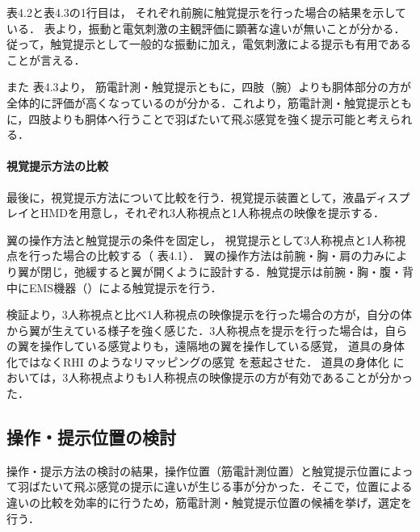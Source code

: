 \begin{small}
      表4.2と表4.3の1行目は，
      それぞれ前腕に触覚提示を行った場合の結果を示している．
      表より，振動と電気刺激の主観評価に顕著な違いが無いことが分かる．従って，触覚提示として一般的な振動に加え，電気刺激による提示も有用であることが言える．

      また
      表4.3より，
      筋電計測・触覚提示ともに，四肢（腕）よりも胴体部分の方が全体的に評価が高くなっているのが分かる．これより，筋電計測・触覚提示ともに，四肢よりも胴体へ行うことで羽ばたいて飛ぶ感覚を強く提示可能と考えられる．
      

    \paragraph{視覚提示方法の比較} %
      最後に，視覚提示方法について比較を行う．視覚提示装置として，液晶ディスプレイとHMDを用意し，それぞれ3人称視点と1人称視点の映像を提示する．

      翼の操作方法と触覚提示の条件を固定し，
      視覚提示として3人称視点と1人称視点を行った場合の比較する（
      表4.1）．
      翼の操作方法は前腕・胸・肩の力みにより翼が閉じ，弛緩すると翼が開くように設計する．触覚提示は前腕・胸・腹・背中にEMS機器（）による触覚提示を行う．

      検証より，3人称視点と比べ1人称視点の映像提示を行った場合の方が，自分の体から翼が生えている様子を強く感じた．3人称視点を提示を行った場合は，自らの翼を操作している感覚よりも，遠隔地の翼を操作している感覚，
      道具の身体化ではなくRHI
      のようなリマッピングの感覚
      を惹起させた．
      道具の身体化
      においては，3人称視点よりも1人称視点の映像提示の方が有効であることが分かった．
  
  \subsection{操作・提示位置の検討}
    操作・提示方法の検討の結果，操作位置（筋電計測位置）と触覚提示位置によって羽ばたいて飛ぶ感覚の提示に違いが生じる事が分かった．そこで，位置による違いの比較を効率的に行うため，筋電計測・触覚提示位置の候補を挙げ，選定を行う．
  

\end{small}
